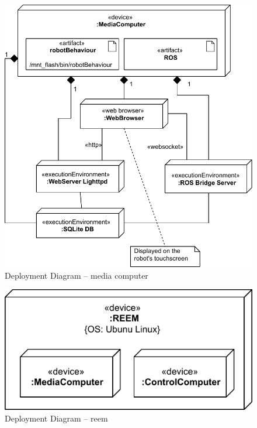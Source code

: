 \begin{figure}[htb]
    \centering
    \includegraphics{figures/design-deployment-mediacomputer.pdf}
    \caption{Deployment Diagram -- media computer}
    \label{fig:deploy-media}
\end{figure}

\begin{figure}[htb]
    \centering
    \includegraphics{figures/design-deployment-reem.pdf}
    \caption{Deployment Diagram -- reem}
    \label{fig:deploy-reem}
\end{figure}

